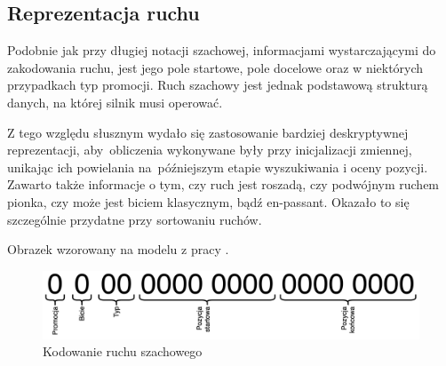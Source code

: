 \subsection{Reprezentacja ruchu}
\label{subsec:reprezentacja-ruchu}

Podobnie jak przy długiej notacji szachowej, informacjami wystarczającymi do zakodowania ruchu, jest jego pole startowe, pole docelowe oraz w niektórych przypadkach typ promocji.
Ruch szachowy jest jednak podstawową strukturą danych, na której silnik musi operować.

Z tego względu słusznym wydało się zastosowanie bardziej deskryptywnej reprezentacji, aby~obliczenia wykonywane były przy inicjalizacji zmiennej, unikając ich powielania na~późniejszym etapie wyszukiwania i oceny pozycji.
Zawarto także informacje o tym, czy ruch jest roszadą, czy podwójnym ruchem pionka, czy może jest biciem klasycznym, bądź en-passant.
Okazało to się szczególnie przydatne przy sortowaniu ruchów.

Obrazek wzorowany na modelu z pracy \cite*{Vrzina2023}.

\begin{figure}[ht]
    \centering
    \includegraphics[width=0.8\linewidth]{rozdzialy/rozdzial01/2_reprezentacja-pozycji/rysunki/kodowanie-ruchu}
    \caption{Kodowanie ruchu szachowego}
    \label{fig:kodowanie-ruchu}
\end{figure}
